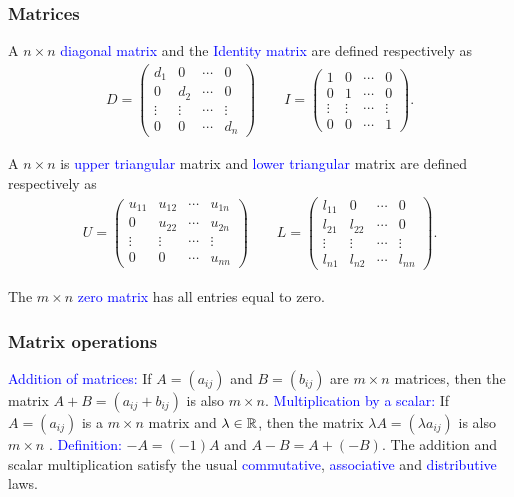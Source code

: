 \documentclass[11pt,aspectratio=169]{beamer}
\begin{document}
\begin{frame}
\frametitle{Matrices}
\begin{small}
 A $n \times n$ \textcolor{blue}{diagonal matrix} and the \textcolor{blue}{Identity matrix} are defined respectively as
\begin{align*}D=\begin{pmatrix} d_1 & 0 & \cdots &0\\
0 & d_2 & \cdots &0 \\
\vdots & \vdots & \cdots &\vdots \\
0 &0 & \cdots &d_n
\end{pmatrix} \qquad I=\begin{pmatrix}1 & 0 & \cdots &0\\
0 & 1 & \cdots &0 \\
\vdots & \vdots & \cdots &\vdots \\
0 &0 & \cdots &1
\end{pmatrix}.
\end{align*}

 A $n \times n$ is \textcolor{blue}{upper triangular} matrix and \textcolor{blue}{lower triangular} matrix are defined respectively as
\begin{align*}U=\begin{pmatrix} u_{11} & u_{12} & \cdots &u_{1n}\\
0 & u_{22} & \cdots &u_{2n} \\
\vdots & \vdots & \cdots &\vdots \\
0 &0 & \cdots &u_{nn}
\end{pmatrix} \qquad L=\begin{pmatrix}l_{11} & 0 & \cdots &0\\
l_{21} & l_{22} & \cdots &0 \\
\vdots & \vdots & \cdots &\vdots \\
l_{n1} &l_{n2} & \cdots &l_{nn}
\end{pmatrix}.
\end{align*}

The $m \times n$ \textcolor{blue}{zero matrix} has all entries equal to zero. 

\end{small}
\end{frame}

\begin{frame}
\frametitle{Matrix operations}
\begin{small}
\textcolor{blue}{Addition of matrices: }If $A=(a_{ij})$ and $B=(b_{ij})$  are $m \times n$ matrices, then the matrix
$A+B=(a_{ij}+b_{ij})$ is also $m \times n$.
\vskip 12pt
\textcolor{blue}{Multiplication by a scalar:} If $A=(a_{ij})$ is a $m \times n$ matrix and $\lambda \in \mathbb R$, then
the matrix $\lambda A=(\lambda a_{ij})$ is also $m \times n$ .
\vskip 12pt
\textcolor{blue}{Definition:} $-A=(-1)A$ and $A-B=A+(-B)$.
\vskip 12pt
The addition and scalar multiplication satisfy the usual \textcolor{blue}{commutative}, \textcolor{blue}{associative} and \textcolor{blue}{distributive} laws.
\end{small}
\end{frame}
\end{document}
